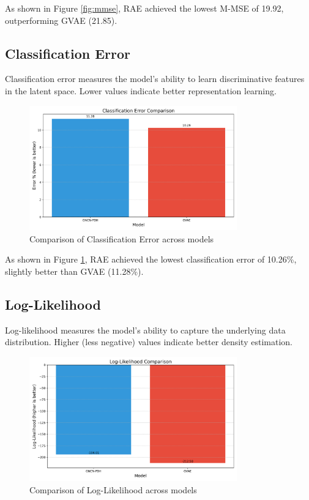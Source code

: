 \documentclass[11pt,a4paper]{article}
\begin{document}
As shown in Figure \ref{fig:mmse}, RAE achieved the lowest M-MSE of 19.92, outperforming GVAE (21.85).

\subsection{Classification Error}
Classification error measures the model's ability to learn discriminative features in the latent space. Lower values indicate better representation learning.

\begin{figure}[H]
    \centering
    \includegraphics[width=0.8\textwidth]{comparison_results/class_error_comparison.png}
    \caption{Comparison of Classification Error across models}
    \label{fig:class_error}
\end{figure}

As shown in Figure \ref{fig:class_error}, RAE achieved the lowest classification error of 10.26\%, slightly better than GVAE (11.28\%).

\subsection{Log-Likelihood}
Log-likelihood measures the model's ability to capture the underlying data distribution. Higher (less negative) values indicate better density estimation.

\begin{figure}[H]
    \centering
    \includegraphics[width=0.8\textwidth]{comparison_results/log_likelihood_comparison.png}
    \caption{Comparison of Log-Likelihood across models}
    \label{fig:log_likelihood}
\end{figure}
\end{document}
